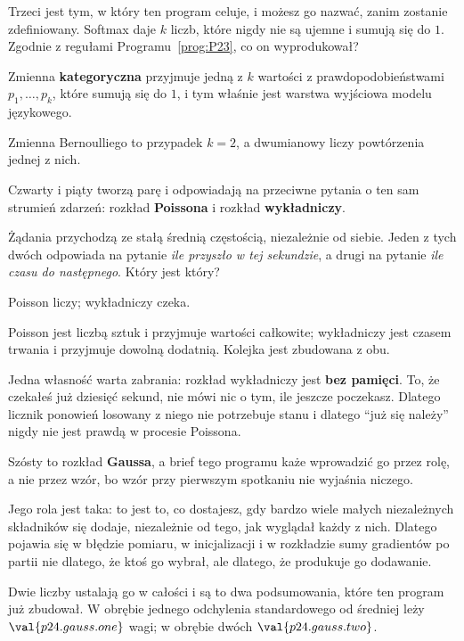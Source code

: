 \begin{fr}
Trzeci jest tym, w który ten program celuje, i możesz go nazwać, zanim
zostanie zdefiniowany. Softmax daje $k$ liczb, które nigdy nie są ujemne i
sumują się do $1$. Zgodnie z regułami Programu~\ref{prog:P23}, co on wyprodukował?
\dotline
\nextframe
\end{fr}

\begin{fr}

Zmienna \textbf{kategoryczna} przyjmuje jedną z $k$ wartości z
prawdopodobieństwami $p_1, \ldots, p_k$, które sumują się do $1$, i tym
właśnie jest warstwa wyjściowa modelu językowego.

Zmienna Bernoulliego to przypadek $k = 2$, a dwumianowy liczy powtórzenia
jednej z nich.
\end{fr}

\begin{fr}
Czwarty i piąty tworzą parę i odpowiadają na przeciwne pytania o ten sam
strumień zdarzeń: rozkład \textbf{Poissona} i rozkład \textbf{wykładniczy}.

Żądania przychodzą ze stałą średnią częstością, niezależnie od siebie. Jeden z
tych dwóch odpowiada na pytanie \emph{ile przyszło w tej sekundzie}, a drugi
na pytanie \emph{ile czasu do następnego}. Który jest który?
\dotline
\nextframe
\end{fr}

\begin{fr}
\begin{ansblock}
Poisson liczy; wykładniczy czeka.
\end{ansblock}

Poisson jest liczbą sztuk i przyjmuje wartości całkowite; wykładniczy jest
czasem trwania i przyjmuje dowolną dodatnią. Kolejka jest zbudowana z obu.

Jedna własność warta zabrania: rozkład wykładniczy jest \textbf{bez pamięci}.
To, że czekałeś już dziesięć sekund, nie mówi nic o tym, ile jeszcze
poczekasz. Dlatego licznik ponowień losowany z niego nie potrzebuje stanu i
dlatego \enquote{już się należy} nigdy nie jest prawdą w procesie Poissona.
\end{fr}

\begin{fr}
Szósty to rozkład \textbf{Gaussa}, a brief tego programu każe wprowadzić go
przez rolę, a nie przez wzór, bo wzór przy pierwszym spotkaniu nie wyjaśnia
niczego.

Jego rola jest taka: to jest to, co dostajesz, gdy bardzo wiele małych
niezależnych składników się dodaje, niezależnie od tego, jak wyglądał każdy z
nich. Dlatego pojawia się w błędzie pomiaru, w inicjalizacji i w rozkładzie
sumy gradientów po partii \dash{} nie dlatego, że ktoś go wybrał, ale dlatego,
że produkuje go dodawanie.

Dwie liczby ustalają go w całości i są to dwa podsumowania, które ten program
już zbudował. W obrębie jednego odchylenia standardowego od średniej leży
$\val{p24.gauss.one}$ wagi; w obrębie dwóch \dash{} $\val{p24.gauss.two}$.
\end{fr}

